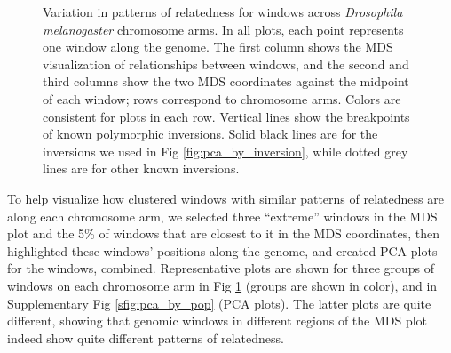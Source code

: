 \documentclass[11pt, oneside]{article}   	%
\newcommand{\Figure}{Fig }
\newcommand{\Figure}{{Figure }}
\begin{document}
\begin{figure}
\begin{center}
       \fi
    \end{center}
    \caption{
        Variation in patterns of relatedness for windows across \textit{Drosophila melanogaster} chromosome arms.
        In all plots, each point represents one window along the genome.
         The first column shows the MDS visualization of relationships between windows, 
         and the second and third columns show 
        the two MDS coordinates
         against the midpoint of each window;
         rows correspond to chromosome arms.
         Colors are consistent for plots in each row. 
         Vertical lines show the breakpoints of known polymorphic inversions.   
         Solid black lines are for the inversions we used in \Figure \ref{fig:pca_by_inversion},
         while dotted grey lines are for other known inversions.     
         \label{fig:mds_allchr}
    }
\end{figure}



To help visualize how clustered windows with similar patterns of relatedness are along each chromosome arm, 
we selected three ``extreme'' windows in the MDS plot
and the 5\% of windows that are closest to it in the MDS coordinates,
then highlighted these windows' positions along the genome,
and created PCA plots for the windows, combined.
Representative plots are shown for three groups of windows on each chromosome arm
in \Figure \ref{fig:mds_allchr} (groups are shown in color),
and in Supplementary \Figure \ref{sfig:pca_by_pop} (PCA plots).
The latter plots are quite different,
showing that genomic windows in different regions of the MDS plot 
indeed show quite different patterns of relatedness.
\end{document}
